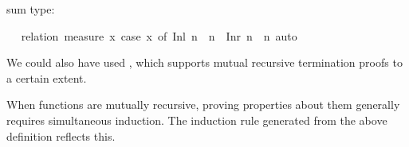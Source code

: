 \begin{isabellebody}
\begin{isamarkuptext}
  sum type:%
\end{isamarkuptext}%
\isamarkuptrue%
\isamarkupfalse%
\ \isanewline
%
\isadelimproof
%
\endisadelimproof
%
\isatagproof
{}\isamarkupfalse%
\ {}relation\ {}measure\ {}{}x{}\ case\ x\ of\ Inl\ n\ {}\ n\ {}\ Inr\ n\ {}\ n{}{}{}\ auto%
\endisatagproof
{\isafoldproof}%
%
\isadelimproof
%
\endisadelimproof
%
\begin{isamarkuptext}%
We could also have used , which
  supports mutual recursive termination proofs to a certain extent.%
\end{isamarkuptext}%
\isamarkuptrue%
%
\isamarkuptrue%
%
\begin{isamarkuptext}%
When functions are mutually recursive, proving properties about them
  generally requires simultaneous induction. The induction rule 
  generated from the above definition reflects this.


\end{isamarkuptext}
\end{isabellebody}
